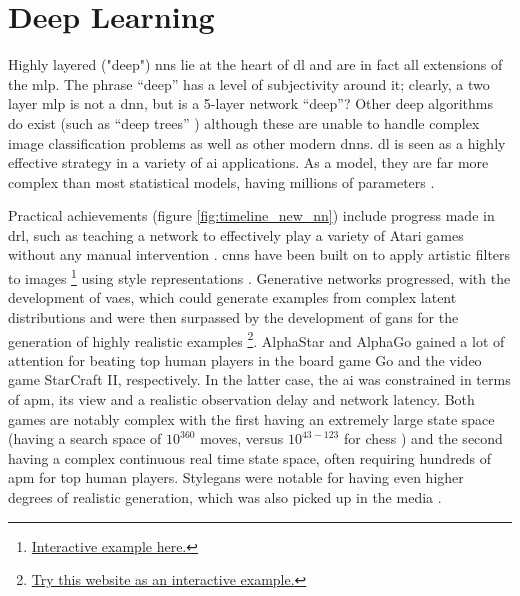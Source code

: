 \section{Deep Learning}


Highly layered ("deep") \gls{nn}s lie at the heart of \gls{dl} and are in fact all extensions of the \gls{mlp}. The phrase \enquote{deep} has a level of subjectivity around it; clearly, a two \gls{layer} \gls{mlp} is not a \gls{dnn}, but is a 5-layer network \enquote{deep}? Other deep algorithms do exist (such as \enquote{deep trees} \cite{deep_forest}) although these are unable to handle complex image classification problems as well as other modern {dnn}s. \gls{dl} is seen as a highly effective strategy in a variety of \gls{ai} applications. As a model, they are far more complex than most statistical models, having millions of parameters \cite{unreasonable_dl}.  
\bigskip

Practical achievements (figure \ref{fig:timeline_new_nn}) include progress made in \gls{drl}, such as teaching a network to effectively play a variety of Atari games without any manual intervention \cite{drl_atari}. \gls{cnn}s have been built on to apply artistic filters to images \footnote{\href{https://deepart.io/}{Interactive example here.}} using style representations \cite{neural_style}. Generative networks progressed, with the development of \gls{vae}s, which could generate examples from complex latent distributions and were then surpassed by the development of \gls{gan}s for the generation of highly realistic examples \cite{gans}\footnote{\href{http://www.whichfaceisreal.com/index.php}{Try this website as an interactive example.}}. AlphaStar \cite{alphastar} and AlphaGo \cite{alphago} gained a lot of attention \cite{press_alpha_go} \cite{press_alpha_star} for beating top human players in the board game Go and the video game StarCraft II, respectively. In the latter case, the \gls{ai} was constrained in terms of \gls{apm}, its view and a realistic observation delay and network latency. Both games are notably complex with the first having an extremely large state space (having a search space of $10^360$ moves, versus $10^{43-123}$ for chess \cite{moves_chess_go}) and the second having a complex continuous real time state space, often requiring hundreds of \gls{apm} for top human players. Style\gls{gan}s were notable for having even higher degrees of realistic generation, which was also picked up in the media \cite{press_stylegan}.
\bigskip

